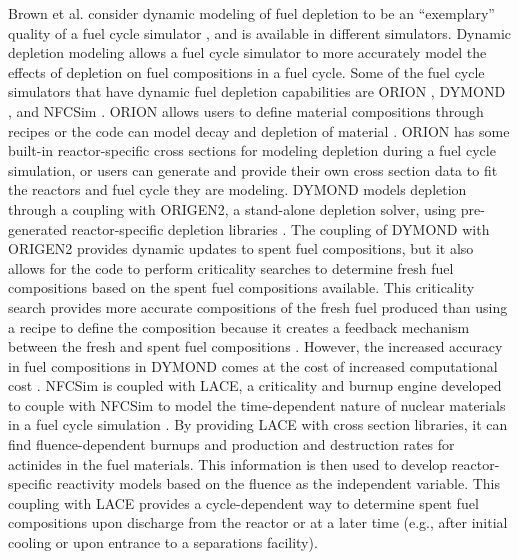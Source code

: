 Brown et al. consider dynamic modeling of fuel depletion to be an 
``exemplary'' quality 
of a fuel cycle simulator \cite{brown_identification_2016},
and is available in different simulators. Dynamic depletion 
modeling allows a fuel cycle simulator to more accurately model  
the effects of depletion on fuel compositions in a fuel cycle. Some of the 
fuel cycle simulators that have dynamic fuel depletion capabilities 
are ORION \cite{feng_standardized_2016}, \gls{DYMOND} 
\cite{richards_application_2021}, and \gls{NFCSim} \cite{schneider_nfcsim:_2005}.
ORION allows 
users to define material compositions through recipes or the code can 
model decay and depletion of material \cite{sunny_transition_2015}. ORION 
has some built-in reactor-specific cross sections for modeling 
depletion during a fuel cycle simulation, or users can generate 
and provide their own cross section data to fit the reactors and fuel cycle 
they are modeling. \gls{DYMOND} models depletion through a coupling with 
ORIGEN2, a stand-alone depletion solver, using pre-generated 
reactor-specific depletion libraries \cite{richards_application_2021}.
The coupling of \gls{DYMOND} with ORIGEN2 provides dynamic updates to 
spent fuel compositions, but it also allows for the code to perform 
criticality searches to determine fresh fuel compositions based on 
the spent fuel compositions available. This criticality search provides 
more accurate compositions of the fresh fuel produced than using a recipe 
to define the composition because it creates a feedback mechanism 
between the fresh and spent fuel compositions \cite{richards_application_2021}.
However, the increased accuracy in fuel compositions in \gls{DYMOND} comes 
at the cost of increased computational cost \cite{richards_application_2021}.
\gls{NFCSim} is coupled with \gls{LACE}, a criticality and burnup 
engine developed to couple with \gls{NFCSim} to model the 
time-dependent nature of nuclear materials in a fuel cycle simulation
\cite{schneider_nfcsim:_2005}. By providing \gls{LACE} with cross 
section libraries, it can find fluence-dependent burnups and production 
and destruction rates for actinides in the fuel materials. This 
information is then used to develop reactor-specific reactivity models 
based on the fluence as the independent variable. This coupling 
with \gls{LACE} provides a cycle-dependent way to determine 
spent fuel compositions upon discharge from the reactor or at a 
later time (e.g., after initial cooling or upon entrance to a 
separations facility). 

